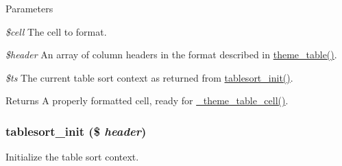 \begin{DoxyParams}{Parameters}
\item[{\em \$cell}]The cell to format. \item[{\em \$header}]An array of column headers in the format described in \hyperlink{group__themeable_ga9e35aa108c35f87b588197138a51823d}{theme\_\-table()}. \item[{\em \$ts}]The current table sort context as returned from \hyperlink{tablesort_8inc_afee7fc97d83c8e51399e9b41ccbae927}{tablesort\_\-init()}.\end{DoxyParams}
\begin{DoxyReturn}{Returns}
A properly formatted cell, ready for \hyperlink{includes_2theme_8inc_adf2a29e2c6631b7c0ecd833cafda9b40}{\_\-theme\_\-table\_\-cell()}. 
\end{DoxyReturn}
\hypertarget{tablesort_8inc_afee7fc97d83c8e51399e9b41ccbae927}{
\subsubsection[{tablesort\_\-init}]{\setlength{\rightskip}{0pt plus 5cm}tablesort\_\-init (\$ {\em header})}}
\label{tablesort_8inc_afee7fc97d83c8e51399e9b41ccbae927}
Initialize the table sort context. 